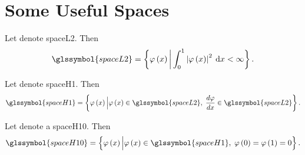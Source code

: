 \section{Some Useful Spaces}
%
\begin{definition}	\label{def:SpaceL2}
	Let  denote \gls{spaceL2}. Then
	\begin{equation}
		\glssymbol{spaceL2} = \left\{ \varphi \left( x \right) \bigg \vert \int_0^1 \left|\varphi \left( x \right)\right|^2 \dd x < \infty \right\}.
	\end{equation}
\end{definition}
%
\begin{definition}	\label{def:Space_H1}
	Let  denote \gls{spaceH1}. Then
	\begin{equation}
		\glssymbol{spaceH1} = \left\{ \varphi \left( x \right) \Big \vert \varphi \left( x \right) \in \glssymbol{spaceL2}, \;
			\frac{d \varphi }{dx} \in \glssymbol{spaceL2} \right\}.
	\end{equation}
\end{definition}
%
\begin{definition}	\label{def:Space_H10}
	Let  denote a \gls{spaceH10}. Then
	\begin{equation}
		\glssymbol{spaceH10} = \left\{ \varphi \left( x \right) \Big \vert \varphi \left( x \right) \in \glssymbol{spaceH1}, \;
			\varphi \left( 0 \right) = \varphi \left( 1 \right) = 0 \right\}.
	\end{equation}
\end{definition}
%

